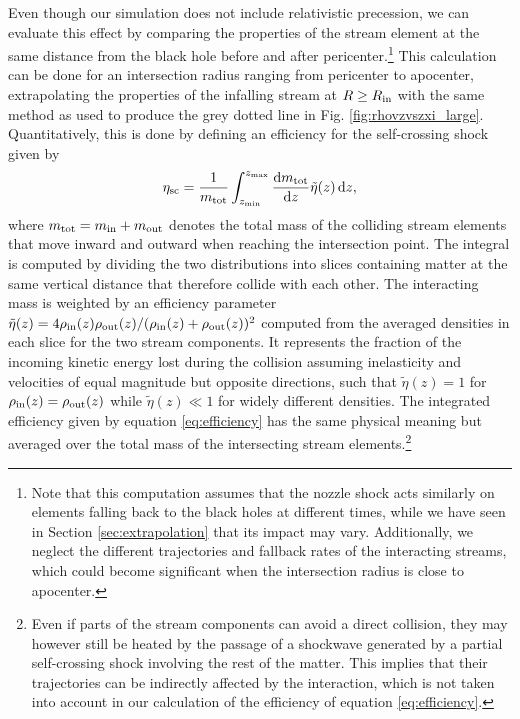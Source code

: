 \documentclass[a4paper,fleqn,usenatbib]{mnras}
\newcommand{\be}{\begin{equation}}
\newcommand{\ee}{\end{equation}}
\newcommand*\diff{\mathop{}\!\mathrm{d}}
\begin{document}
Even though our simulation does not include relativistic precession, we can evaluate this effect by comparing the properties of the stream element at the same distance from the black hole before and after pericenter.\footnote{Note that this computation assumes that the nozzle shock acts similarly on elements falling back to the black holes at different times, while we have seen in Section \ref{sec:extrapolation} that its impact may vary. Additionally, we neglect the different trajectories and fallback rates of the interacting streams, which could become significant when the intersection radius is close to apocenter.} This calculation can be done for an intersection radius ranging from pericenter to apocenter, extrapolating the properties of the infalling stream at $R\geq R_{\rm in}$ with the same method as used to produce the grey dotted line in Fig. \ref{fig:rhovzvszxi_large}. Quantitatively, this is done by defining an efficiency for the self-crossing shock given by
\be
\eta_{\rm sc} = \frac{1}{m_{\rm tot}} \int_{z_{\rm min}}^{z_{\rm max}}  \frac{\diff m_{\rm tot}}{\diff z} \tilde{\eta}(z)  \diff z,
\label{eq:efficiency}
\ee
where $m_{\rm tot} = m_{\rm in}+m_{\rm out}$ denotes the total mass of the colliding stream elements that move inward and outward when reaching the intersection point. The integral is computed by dividing the two distributions into slices containing matter at the same vertical distance that therefore collide with each other. The interacting mass is weighted by an efficiency parameter $\tilde{\eta}(z) = 4 \rho_{\rm in}(z) \rho_{\rm out}(z) / (\rho_{\rm in}(z) +\rho_{\rm out}(z))^2$ computed from the averaged densities in each slice for the two stream components. It represents the fraction of the incoming kinetic energy lost during the collision assuming inelasticity and velocities of equal magnitude but opposite directions, such that $\tilde{\eta}(z) = 1$ for $\rho_{\rm in}(z) = \rho_{\rm out}(z)$ while $\tilde{\eta}(z) \ll 1$ for widely different densities. The integrated efficiency given by equation \eqref{eq:efficiency} has the same physical meaning but averaged over the total mass of the intersecting stream elements.\footnote{Even if parts of the stream components can avoid a direct collision, they may however still be heated by the passage of a shockwave generated by a partial self-crossing shock involving the rest of the matter. This implies that their trajectories can be indirectly affected by the interaction, which is not taken into account in our calculation of the efficiency of equation \eqref{eq:efficiency}.}
\end{document}
